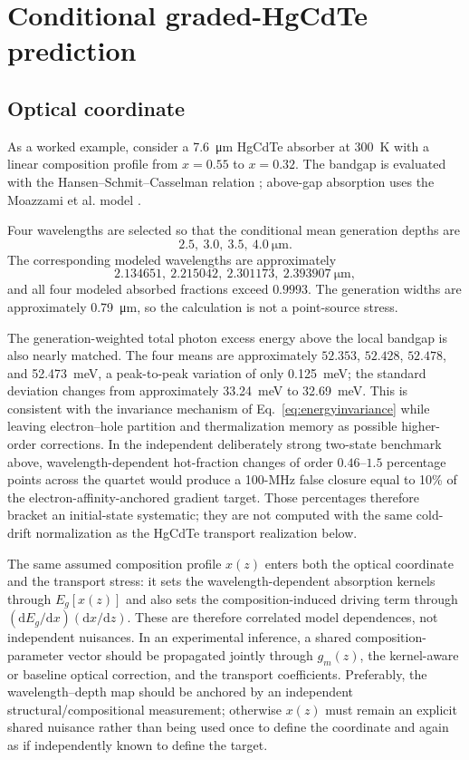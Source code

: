 \documentclass[11pt]{article}
\newcommand{\dd}{\mathrm{d}}
\begin{document}
\section{Conditional graded-HgCdTe prediction}

\subsection{Optical coordinate}

As a worked example, consider a \SI{7.6}{\micro\meter} HgCdTe absorber at \SI{300}{K} with a linear composition profile from $x=0.55$ to $x=0.32$. The bandgap is evaluated with the Hansen--Schmit--Casselman relation \cite{Hansen1982}; above-gap absorption uses the Moazzami et al. model \cite{Moazzami2005}.

Four wavelengths are selected so that the conditional mean generation depths are
\begin{equation}
2.5,\ 3.0,\ 3.5,\ 4.0\ \si{\micro\meter}.
\end{equation}
The corresponding modeled wavelengths are approximately
\begin{equation}
2.134651,\ 2.215042,\ 2.301173,\ 2.393907\ \si{\micro\meter},
\end{equation}
and all four modeled absorbed fractions exceed $0.9993$. The generation widths are approximately \SI{0.79}{\micro\meter}, so the calculation is not a point-source stress.

The generation-weighted total photon excess energy above the local bandgap is also nearly matched. The four means are approximately $52.353$, $52.428$, $52.478$, and \SI{52.473}{meV}, a peak-to-peak variation of only \SI{0.125}{meV}; the standard deviation changes from approximately \SI{33.24}{meV} to \SI{32.69}{meV}. This is consistent with the invariance mechanism of Eq.~\eqref{eq:energyinvariance} while leaving electron--hole partition and thermalization memory as possible higher-order corrections. In the independent deliberately strong two-state benchmark above, wavelength-dependent hot-fraction changes of order $0.46$--$1.5$ percentage points across the quartet would produce a 100-MHz false closure equal to 10\% of the electron-affinity-anchored gradient target. Those percentages therefore bracket an initial-state systematic; they are not computed with the same cold-drift normalization as the HgCdTe transport realization below.

The same assumed composition profile $x(z)$ enters both the optical coordinate and the transport stress: it sets the wavelength-dependent absorption kernels through $E_g[x(z)]$ and also sets the composition-induced driving term through $(\dd E_g/\dd x)(\dd x/\dd z)$. These are therefore correlated model dependences, not independent nuisances. In an experimental inference, a shared composition-parameter vector should be propagated jointly through $g_m(z)$, the kernel-aware or baseline optical correction, and the transport coefficients. Preferably, the wavelength--depth map should be anchored by an independent structural/compositional measurement; otherwise $x(z)$ must remain an explicit shared nuisance rather than being used once to define the coordinate and again as if independently known to define the target.
\end{document}
